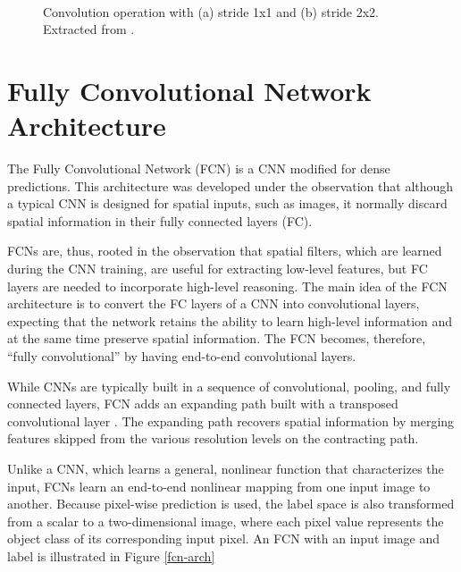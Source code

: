 \begin{figure}[!htb]
\centering
{}
\\


\caption{Convolution operation with (a) stride 1x1 and (b) stride 2x2. Extracted from \cite{dumoulin2016guide}.} \label{fig:convop}
\end{figure}


\section{Fully Convolutional Network Architecture}

The Fully Convolutional Network (FCN) \cite{long2015fully} is a CNN modified for dense
predictions. This architecture was developed under the observation that although a typical CNN is designed for spatial inputs, such as images, it normally discard spatial information in their fully connected layers (FC). 

FCNs are, thus, rooted in the observation that spatial filters, which are learned during the CNN training, are useful for extracting low-level features, but FC layers are needed to incorporate high-level reasoning. The main idea of the FCN architecture is to convert the FC layers of a CNN into convolutional layers, expecting that the network retains the ability to learn high-level information and at the same time preserve spatial information. The FCN becomes, therefore, ``fully convolutional'' by having end-to-end convolutional layers. 

While CNNs are typically built in a sequence of convolutional, pooling, and fully connected layers, FCN adds an expanding path built with a transposed convolutional layer \cite{long2015fully}. The expanding path recovers spatial information by merging features skipped from the various resolution levels on the contracting path.

Unlike a CNN, which learns a general, nonlinear function that characterizes the input, FCNs learn an end-to-end nonlinear mapping from one input image to another. Because pixel-wise prediction is used, the label space is also transformed from a scalar to a two-dimensional image, where each pixel value represents the object class of its corresponding input pixel. An FCN with an input image and label is illustrated in Figure \ref{fcn-arch}


